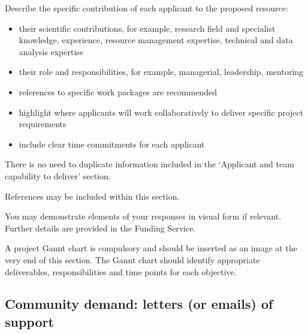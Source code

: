 \documentclass[12in]{article}
\begin{document}
{\begin{itemize}
\end{itemize}

Describe the specific contribution of each applicant to the proposed resource:

\begin{itemize}

	\item their scientific contributions, for example, research field and specialist
knowledge, experience, resource management expertise, technical and data
analysis expertise

	\item their role and responsibilities, for example, managerial, leadership, mentoring
	\item references to specific work packages are recommended
	\item highlight where applicants will work collaboratively to deliver specific project
requirements
	\item include clear time commitments for each applicant
\end{itemize}

There is no need to duplicate information included in the ‘Applicant and team
capability to deliver’ section.

References may be included within this section.

You may demonstrate elements of your responses in visual form if relevant.
Further details are provided in the Funding Service.

A project Gannt chart is compulsory and should be inserted as an image at the
very end of this section. The Gannt chart should identify appropriate
deliverables, responsibilities and time points for each objective.
}

\pagebreak

\subsection{Community demand: letters (or emails) of support}
\end{document}
